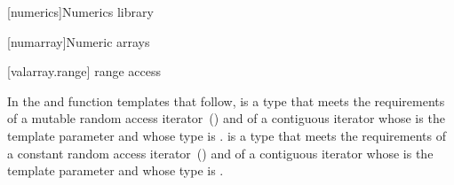 
[numerics]{Numerics library}

\setcounter{section}{6}
[numarray]{Numeric arrays}


\setcounter{subsection}{9}
[valarray.range]{ range access}

\pnum
In the  and  function templates that follow, 
is a type that meets the requirements of a mutable random access
iterator~()
and of a contiguous iterator
whose  is the template
parameter  and whose  type is .  is a
type that meets the requirements of a constant random access
iterator~()
and of a contiguous iterator
whose  is the template
parameter  and whose  type is .

\pnum [...]
